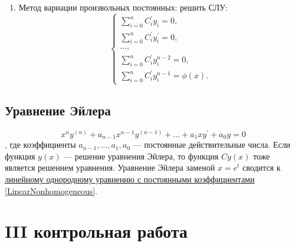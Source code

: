 \documentclass[a5paper,10pt]{article}
\begin{document}
\begin{enumerate}
\begin{enumerate}
						\item Метод вариации произвольных постоянных: решить СЛУ:
							\begin{equation*}
								\begin{cases}
									\sum\limits^n_{i=0}C^{\prime}_i y_i = 0,\\
									\sum\limits^n_{i=0}C^{\prime}_i y^{\prime}_i = 0,\\
									\ldots,\\
									\sum\limits^n_{i=0}C^{\prime}_i y^{n-2}_i = 0,\\
									\sum\limits^n_{i=0}C^{\prime}_i y^{n-1}_i = \phi(x).
								\end{cases}
							\end{equation*}
					\end{enumerate}
			\end{enumerate}

		\subsection{Уравнение Эйлера}
			$$ x^ny^{(n)} + a_{n-1}x^{n-1}y^{(n-1)} + \ldots + a_1xy^{\prime} + a_0y = 0 $$, где коэффициенты $ a_{n-1},\ldots,a_1,a_0 $ — постоянные действительные числа.
			Если функция $y(x)$ — решение уравнения Эйлера, то функция $Cy(x)$ тоже является решением уравнения.
			Уравнение Эйлера заменой $ x = e^t $ сводится к \underline{линейному однородному уравнению с постоянными коэффициентами} \ref{LinearNonhomogeneous}.

		\newpage

	\section{III контрольная работа}
\end{document}
